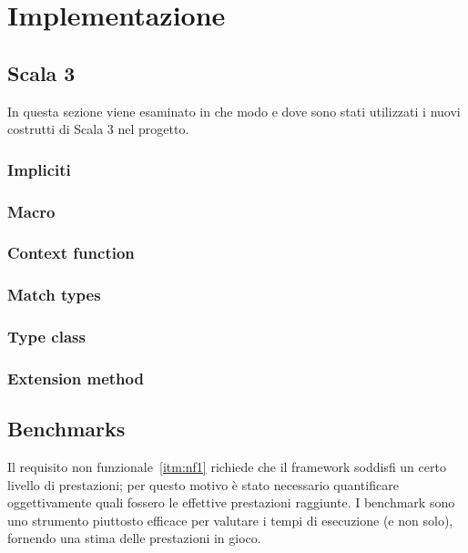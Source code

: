 \chapter{Implementazione}\label{ch:implementazione}
\section{Scala 3}\label{sec:scala-3}
In questa sezione viene esaminato in che modo e dove sono stati utilizzati i nuovi costrutti di Scala 3 nel progetto.

\subsection{Impliciti}\label{subsec:impliciti}

\subsection{Macro}\label{subsec:macro}

\subsection{Context function}\label{subsec:context-function}

\subsection{Match types}\label{subsec:match-types}

\subsection{Type class}\label{subsec:type-class}

\subsection{Extension method}\label{subsec:extension-method}

\section{Benchmarks}\label{sec:benchmarks}
Il requisito non funzionale~\ref{itm:nf1} richiede che il framework soddisfi un certo livello di prestazioni;
per questo motivo è stato necessario quantificare oggettivamente quali fossero le effettive prestazioni raggiunte.
I benchmark sono uno strumento piuttosto efficace per valutare i tempi di esecuzione (e non solo), fornendo
una stima delle prestazioni in gioco.

